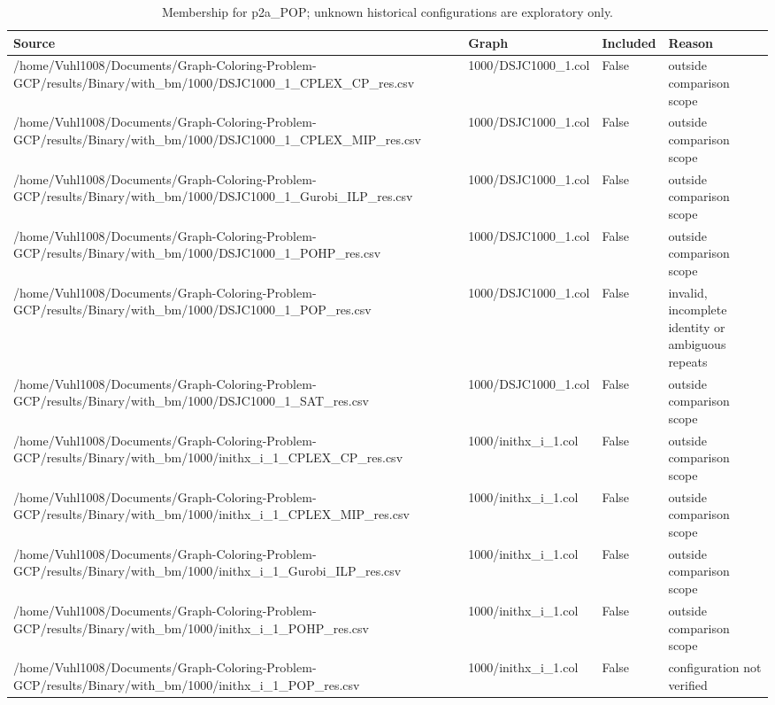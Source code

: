 \begin{table}[htbp]
\centering
\caption{Membership for p2a\_POP; unknown historical configurations are exploratory only.}
\label{tab:p2a-POP-membership}
\begin{tabular}{llll}
\hline
Source & Graph & Included & Reason \\
\hline
/home/Vuhl1008/Documents/Graph-Coloring-Problem-GCP/results/Binary/with\_bm/1000/DSJC1000\_1\_CPLEX\_CP\_res.csv & 1000/DSJC1000\_1.col & False & outside comparison scope \\
/home/Vuhl1008/Documents/Graph-Coloring-Problem-GCP/results/Binary/with\_bm/1000/DSJC1000\_1\_CPLEX\_MIP\_res.csv & 1000/DSJC1000\_1.col & False & outside comparison scope \\
/home/Vuhl1008/Documents/Graph-Coloring-Problem-GCP/results/Binary/with\_bm/1000/DSJC1000\_1\_Gurobi\_ILP\_res.csv & 1000/DSJC1000\_1.col & False & outside comparison scope \\
/home/Vuhl1008/Documents/Graph-Coloring-Problem-GCP/results/Binary/with\_bm/1000/DSJC1000\_1\_POHP\_res.csv & 1000/DSJC1000\_1.col & False & outside comparison scope \\
/home/Vuhl1008/Documents/Graph-Coloring-Problem-GCP/results/Binary/with\_bm/1000/DSJC1000\_1\_POP\_res.csv & 1000/DSJC1000\_1.col & False & invalid, incomplete identity or ambiguous repeats \\
/home/Vuhl1008/Documents/Graph-Coloring-Problem-GCP/results/Binary/with\_bm/1000/DSJC1000\_1\_SAT\_res.csv & 1000/DSJC1000\_1.col & False & outside comparison scope \\
/home/Vuhl1008/Documents/Graph-Coloring-Problem-GCP/results/Binary/with\_bm/1000/inithx\_i\_1\_CPLEX\_CP\_res.csv & 1000/inithx\_i\_1.col & False & outside comparison scope \\
/home/Vuhl1008/Documents/Graph-Coloring-Problem-GCP/results/Binary/with\_bm/1000/inithx\_i\_1\_CPLEX\_MIP\_res.csv & 1000/inithx\_i\_1.col & False & outside comparison scope \\
/home/Vuhl1008/Documents/Graph-Coloring-Problem-GCP/results/Binary/with\_bm/1000/inithx\_i\_1\_Gurobi\_ILP\_res.csv & 1000/inithx\_i\_1.col & False & outside comparison scope \\
/home/Vuhl1008/Documents/Graph-Coloring-Problem-GCP/results/Binary/with\_bm/1000/inithx\_i\_1\_POHP\_res.csv & 1000/inithx\_i\_1.col & False & outside comparison scope \\
/home/Vuhl1008/Documents/Graph-Coloring-Problem-GCP/results/Binary/with\_bm/1000/inithx\_i\_1\_POP\_res.csv & 1000/inithx\_i\_1.col & False & configuration not verified \\

\end{tabular}
\end{table}
